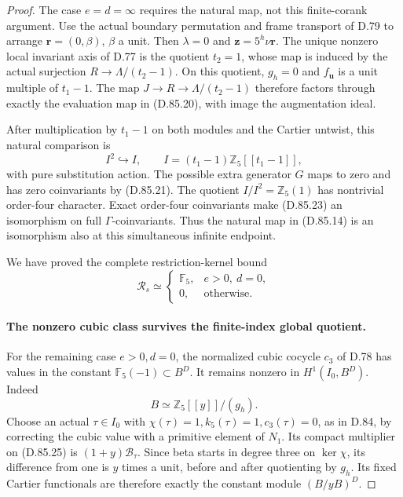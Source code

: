 \begin{proof}
The case \(e=d=\infty\) requires the natural map, not
this finite-corank argument. Use the actual boundary
permutation and frame transport of D.79 to arrange
\(\mathbf r=(0,\beta)\), \(\beta\) a unit. Then
\(\lambda=0\) and \(\mathbf z=5^h\nu\mathbf r\).
The unique nonzero local invariant axis of D.77 is the
quotient \(t_2=1\), whose map is induced by the actual
surjection \(R\to\Lambda/(t_2-1)\). On this quotient,
\(g_h=0\) and \(f_{\mathbf u}\) is a unit multiple of
\(t_1-1\). The map \(J\to R\to\Lambda/(t_2-1)\)
therefore factors through exactly the evaluation map
in (D.85.20), with image the augmentation ideal.

After multiplication by \(t_1-1\) on both modules and
the Cartier untwist, this natural comparison is
\[
 I^2\hookrightarrow I,\qquad
 I=(t_1-1)\mathbb Z_5[[t_1-1]],
                                                               \tag{D.85.23}
\]
with pure substitution action. The possible extra generator
\(G\) maps to zero and has zero coinvariants by (D.85.21).
The quotient \(I/I^2=\mathbb Z_5(1)\) has nontrivial
order-four character. Exact order-four coinvariants make
(D.85.23) an isomorphism on full \(\Gamma\)-coinvariants.
Thus the natural map in (D.85.14) is an isomorphism also
at this simultaneous infinite endpoint.

We have proved the complete restriction-kernel bound
\[
 \mathcal R_s\simeq
 \begin{cases}
 \mathbb F_5,&e>0,\ d=0,\\
 0,&\text{otherwise}.
 \end{cases}                                                    \tag{D.85.24}
\]

\paragraph{The nonzero cubic class survives the finite-index global quotient.}
For the remaining case \(e>0,d=0\), the normalized cubic
cocycle \(c_3\) of D.78 has values in the constant
\(\mathbb F_5(-1)\subset B^D\). It remains nonzero in
\(H^1(I_0,B^D)\). Indeed
\[
                    B\simeq\mathbb Z_5[[y]]/(g_h).
                                                               \tag{D.85.25}
\]
Choose an actual \(\tau\in I_0\) with
\(\chi(\tau)=1,k_5(\tau)=1,c_3(\tau)=0\), as in D.84,
by correcting the cubic value with a primitive element of
\(N_1\). Its compact multiplier on (D.85.25) is
\((1+y)\mathcal B_\tau\). Since beta starts in degree
three on \(\ker\chi\), its difference from one is
\(y\) times a unit, before and after quotienting by \(g_h\).
Its fixed Cartier functionals are therefore exactly the
constant module \((B/yB)^D\).


\end{proof}
